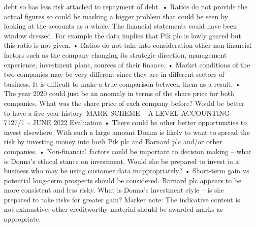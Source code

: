 \documentclass{article}
\begin{document}
debt so has less risk attached to repayment of debt. \newline
• Ratios do not provide the actual figures so could be masking a bigger problem that could be seen by \newline
looking at the accounts as a whole.  The financial statements could have been window dressed.   For \newline
example the data implies that Pik plc is lowly geared but this ratio is not given. \newline
• Ratios do not take into consideration other non-financial factors such as the company changing its \newline
strategic direction, management experience, investment plans, sources of their finance. \newline
• Market conditions of the two companies may be very different since they are in different sectors of \newline
business.  It is difficult to make a true comparison between them as a result. \newline
• The year 2020 could just be an anomaly in terms of the share price for both companies.  What was the \newline
share price of each company before?  Would be better to have a five-year history. \newline
 \newline
 \newline
MARK SCHEME – A-LEVEL ACCOUNTING – 7127/1 – JUNE 2022  \newline
Evaluation \newline
• There could be other better opportunities to invest elsewhere.  With such a large amount Donna is \newline
likely to want to spread the risk by investing money into both Pik plc and Barnard plc and/or other \newline
companies. \newline
• Non-financial factors could be important to decision making – what is Donna’s ethical stance on \newline
investment.  Would she be prepared to invest in a business who may be using customer data \newline
inappropriately? \newline
• Short-term gain vs potential long-term prospects should be considered.  Barnard plc appears to be \newline
more consistent and less risky.  What is Donna’s investment style – is she prepared to take risks for \newline
greater gain? \newline
 \newline
Marker note: \newline
 \newline
The indicative content is not exhaustive: other creditworthy material should be awarded marks as \newline
appropriate. \newline
\end{document}

